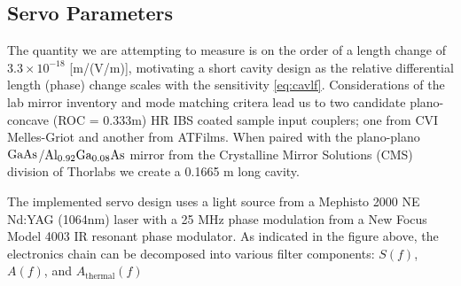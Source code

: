 \subsection{Servo Parameters}
The quantity we are attempting to measure is on the order of a length change of $3.3 \times 10^{-18}$ [m/(V/m)], motivating a short cavity design as the relative differential length (phase) change scales with the sensitivity \autoref{eq:cavlf}. Considerations of the lab mirror inventory and mode matching critera lead us to two candidate plano-concave (ROC = 0.333m) HR IBS coated sample input couplers; one from CVI Melles-Griot and another from ATFilms. When paired with the plano-plano $\mathrm{GaAs}$/$\mathrm{Al_{0.92}Ga_{0.08}As}$  mirror from the Crystalline Mirror Solutions (CMS) division of Thorlabs we create a 0.1665 m long cavity.


The implemented servo design uses a light source from a Mephisto 2000 NE Nd:YAG (1064nm) laser with a 25 MHz phase modulation from a New Focus Model 4003 IR resonant phase modulator. As indicated in the figure above, the electronics chain can be decomposed into various filter components: $S(f)$, $A(f)$, and $A_\mathrm{thermal}(f)$

